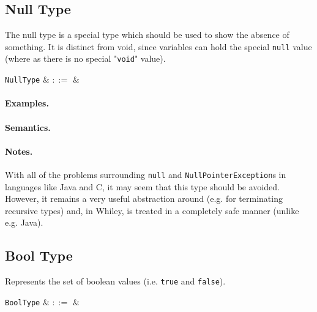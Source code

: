 
\subsection{Null Type}

The null type is a special type which should be used to show the absence of something. It is distinct from void, since variables can hold the special \lstinline{null} value (where as there is no special "\lstinline{void}" value).

\begin{syntax}
  \verb+NullType+ & $::=$ &  \\
\end{syntax}

\paragraph{Examples.}

\paragraph{Semantics.}

\paragraph{Notes.}  With all of the problems surrounding \lstinline{null} and \lstinline{NullPointerException}s in languages like Java and C, it may seem that this type should be avoided. However, it remains a very useful abstraction around (e.g. for terminating recursive types) and, in Whiley, is treated in a completely safe manner (unlike e.g. Java).


\subsection{Bool Type}

Represents the set of boolean values (i.e. \lstinline{true} and \lstinline{false}).

\begin{syntax}
 \verb+BoolType+ & $::=$ &  \\
\end{syntax}

